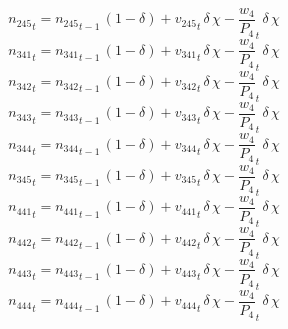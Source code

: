 \begin{dmath}
{{n_{245}}}_{t}={{n_{245}}}_{t-1}\, \left(1-{{\delta}}\right)+{{v_{245}}}_{t}\, {{\delta}}\, {{\chi}}-{{\frac{w_{4}}{P_{4}}}}_{t}\, {{\delta}}\, {{\chi}}
\end{dmath}
\begin{dmath}
{{n_{341}}}_{t}={{n_{341}}}_{t-1}\, \left(1-{{\delta}}\right)+{{v_{341}}}_{t}\, {{\delta}}\, {{\chi}}-{{\frac{w_{4}}{P_{4}}}}_{t}\, {{\delta}}\, {{\chi}}
\end{dmath}
\begin{dmath}
{{n_{342}}}_{t}={{n_{342}}}_{t-1}\, \left(1-{{\delta}}\right)+{{v_{342}}}_{t}\, {{\delta}}\, {{\chi}}-{{\frac{w_{4}}{P_{4}}}}_{t}\, {{\delta}}\, {{\chi}}
\end{dmath}
\begin{dmath}
{{n_{343}}}_{t}={{n_{343}}}_{t-1}\, \left(1-{{\delta}}\right)+{{v_{343}}}_{t}\, {{\delta}}\, {{\chi}}-{{\frac{w_{4}}{P_{4}}}}_{t}\, {{\delta}}\, {{\chi}}
\end{dmath}
\begin{dmath}
{{n_{344}}}_{t}={{n_{344}}}_{t-1}\, \left(1-{{\delta}}\right)+{{v_{344}}}_{t}\, {{\delta}}\, {{\chi}}-{{\frac{w_{4}}{P_{4}}}}_{t}\, {{\delta}}\, {{\chi}}
\end{dmath}
\begin{dmath}
{{n_{345}}}_{t}={{n_{345}}}_{t-1}\, \left(1-{{\delta}}\right)+{{v_{345}}}_{t}\, {{\delta}}\, {{\chi}}-{{\frac{w_{4}}{P_{4}}}}_{t}\, {{\delta}}\, {{\chi}}
\end{dmath}
\begin{dmath}
{{n_{441}}}_{t}={{n_{441}}}_{t-1}\, \left(1-{{\delta}}\right)+{{v_{441}}}_{t}\, {{\delta}}\, {{\chi}}-{{\frac{w_{4}}{P_{4}}}}_{t}\, {{\delta}}\, {{\chi}}
\end{dmath}
\begin{dmath}
{{n_{442}}}_{t}={{n_{442}}}_{t-1}\, \left(1-{{\delta}}\right)+{{v_{442}}}_{t}\, {{\delta}}\, {{\chi}}-{{\frac{w_{4}}{P_{4}}}}_{t}\, {{\delta}}\, {{\chi}}
\end{dmath}
\begin{dmath}
{{n_{443}}}_{t}={{n_{443}}}_{t-1}\, \left(1-{{\delta}}\right)+{{v_{443}}}_{t}\, {{\delta}}\, {{\chi}}-{{\frac{w_{4}}{P_{4}}}}_{t}\, {{\delta}}\, {{\chi}}
\end{dmath}
\begin{dmath}
{{n_{444}}}_{t}={{n_{444}}}_{t-1}\, \left(1-{{\delta}}\right)+{{v_{444}}}_{t}\, {{\delta}}\, {{\chi}}-{{\frac{w_{4}}{P_{4}}}}_{t}\, {{\delta}}\, {{\chi}}
\end{dmath}
